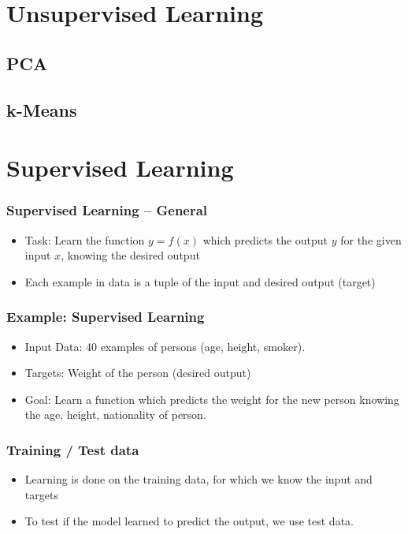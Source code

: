 \documentclass[english,final,compress]{beamer}
\begin{document}
\section{Unsupervised Learning}

\subsection{PCA}



\subsection{k-Means}



\section{Supervised Learning}


\begin{frame}
    \frametitle{Supervised Learning -- General}
    \begin{itemize}
	\item Task: Learn the function $ y = f(x) $ which predicts the output $y$ for the given input $x$, knowing the desired output
        \item Each example in data is a tuple of the input and desired output (target)
    \end{itemize}
\end{frame}


\begin{frame}
    \frametitle{Example: Supervised Learning}
    \begin{itemize}
       \item Input Data: 40 examples of persons (age, height, smoker). 
	\item Targets: Weight of the person (desired output)
	\item Goal: Learn a function which predicts the weight for the new person
		knowing the age, height, nationality of person.

    \end{itemize}
\end{frame}

\begin{frame}
    \frametitle{Training / Test data}
    \begin{itemize}
	\item Learning is done on the training data, for which we know the input and targets
	\item To test if the model learned to predict the output, we use test data. 		
    \end{itemize}
\end{frame}
\end{document}
